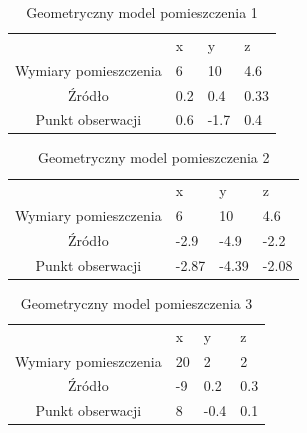 \begin{table}[h]
        \centering
        \begin{threeparttable}
                \caption{Geometryczny model pomieszczenia 1}\label{tab:table_example}
                \begin{tabularx}{0.6\textwidth}{| c | X | X | X |}
                        \midrule
                        		&	x & y & z \\
		Wymiary pomieszczenia & 6 & 10 & 4.6 \\
                        Źródło & 0.2 & 0.4 & 0.33 \\
		Punkt obserwacji & 0.6 & -1.7 & 0.4 \\
                        \bottomrule
                \end{tabularx}
        \end{threeparttable}
\end{table}

\begin{table}[h]
        \centering
        \begin{threeparttable}
                \caption{Geometryczny model pomieszczenia 2}\label{tab:table_example}
                \begin{tabularx}{0.6\textwidth}{| c | X | X | X |}
                        \midrule
                        		&	x & y & z \\
		Wymiary pomieszczenia & 6 & 10 & 4.6 \\
                        Źródło & -2.9 & -4.9 & -2.2 \\
		Punkt obserwacji & -2.87 & -4.39 & -2.08 \\
                        \bottomrule
                \end{tabularx}
        \end{threeparttable}
\end{table}

\begin{table}[h]
        \centering
        \begin{threeparttable}
                \caption{Geometryczny model pomieszczenia 3}\label{tab:table_example}
                \begin{tabularx}{0.6\textwidth}{| c | X | X | X |}
                        \midrule
                        		&	x & y & z \\
		Wymiary pomieszczenia & 20 & 2 & 2 \\
                        Źródło & -9 & 0.2 & 0.3 \\
		Punkt obserwacji & 8 & -0.4 & 0.1 \\
                        \bottomrule
                \end{tabularx}
        \end{threeparttable}
\end{table}

